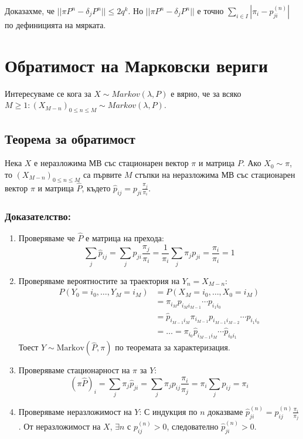 \documentclass{article}
\begin{document}
Доказахме, че $||\pi P^n - \delta_j P^n|| \leq 2q^k$. Но $||\pi P^n - \delta_j P^n||$ е точно $\sum_{i \in I} |\pi_i - p_{ji}^{(n)}|$ по дефиницията на мярката.

\section{Обратимост на Марковски вериги}
Интересуваме се кога за $X \sim Markov(\lambda,P)$ е вярно, че за всяко $M\geq1: (X_{M-n})_{0\leq n \leq M} \sim Markov(\lambda,P)$.
\subsection{Теорема за обратимост}
Нека $X$ е неразложима МВ със стационарен вектор $\pi$ и матрица $P$. Ако $X_0 \sim \pi$, то $(X_{M-n})_{0 \leq n \leq M}$ са първите $M$ стъпки на неразложима МВ със стационарен вектор $\pi$ и матрица $\hat{P}$, където $\hat{p}_{ij} = p_{ji}\frac{\pi_j}{\pi_i}$.

\subsubsection*{Доказателство:}
\begin{enumerate}
\item Проверяваме че $\hat{P}$ е матрица на прехода:
$$\sum_j \hat{p}_{ij} = \sum_j p_{ji}\frac{\pi_j}{\pi_i} = \frac{1}{\pi_i}\sum_j \pi_j p_{ji} = \frac{\pi_i}{\pi_i} = 1$$

\item Проверяваме вероятностите за траектория на $Y_n = X_{M-n}$:
\begin{align*}
P(Y_0=i_0, \dots, Y_M=i_M) &= P(X_M=i_0, \dots, X_0=i_M) \\
&= \pi_{i_M} p_{i_M i_{M-1}} \cdots p_{i_1 i_0} \\
&= \hat{p}_{i_{M-1} i_M} \pi_{i_{M-1}} p_{i_{M-1} i_{M-2}} \cdots p_{i_1 i_0} \\
&= \dots = \pi_{i_0} \hat{p}_{i_{M-1} i_M} \cdots \hat{p}_{i_0 i_1}
\end{align*}
Тоест $Y \sim \text{Markov}(\hat{P}, \pi)$ по теоремата за характеризация.

\item Проверяваме стационарност на $\pi$ за $Y$:
$$(\pi \hat{P})_i = \sum_j \pi_j \hat{p}_{ji} = \sum_j \pi_j p_{ij} \frac{\pi_i}{\pi_j} = \pi_i \sum_j p_{ij} = \pi_i$$

\item Проверяваме неразложимост на $Y$:
С индукция по $n$ доказваме $\hat{p}_{ji}^{(n)} = p_{ij}^{(n)} \frac{\pi_i}{\pi_j}$. От неразложимост на $X$, $\exists n$ с $p_{ij}^{(n)} > 0$, следователно $\hat{p}_{ji}^{(n)} > 0$.
\end{enumerate}
\end{document}

